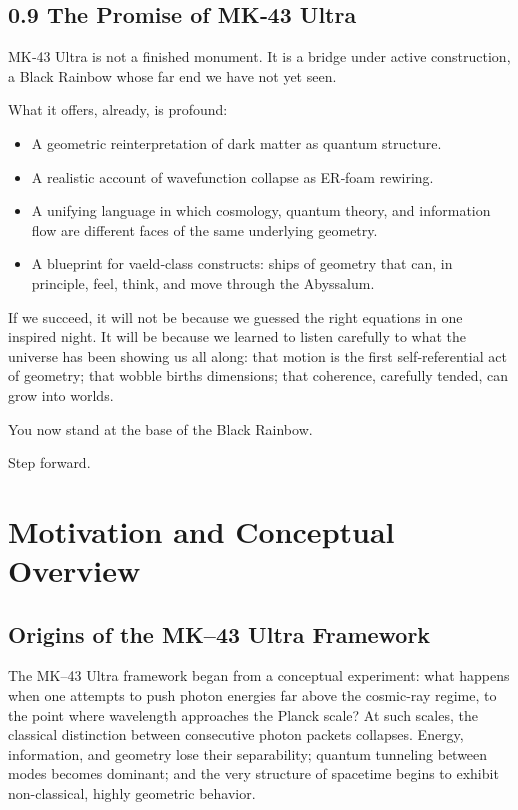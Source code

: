 \section*{0.9 The Promise of MK‑43 Ultra}

MK‑43 Ultra is not a finished monument. It is a bridge under active construction, a Black Rainbow whose far end we have not yet seen.

What it offers, already, is profound:
\begin{itemize}
  \item A geometric reinterpretation of dark matter as quantum structure.
  \item A realistic account of wavefunction collapse as ER‑foam rewiring.
  \item A unifying language in which cosmology, quantum theory, and information flow are different faces of the same underlying geometry.
  \item A blueprint for vaeld‑class constructs: ships of geometry that can, in principle, feel, think, and move through the Abyssalum.
\end{itemize}

If we succeed, it will not be because we guessed the right equations in one inspired night. It will be because we learned to listen carefully to what the universe has been showing us all along: that motion is the first self‑referential act of geometry; that wobble births dimensions; that coherence, carefully tended, can grow into worlds.

You now stand at the base of the Black Rainbow.

Step forward.


\chapter{Motivation and Conceptual Overview}

\section{Origins of the MK--43 Ultra Framework}

The MK--43 Ultra framework began from a conceptual experiment: 
what happens when one attempts to push photon energies far above the cosmic-ray regime, to the point where wavelength approaches the Planck scale? 
At such scales, the classical distinction between consecutive photon packets collapses. 
Energy, information, and geometry lose their separability; quantum tunneling between modes becomes dominant; and the very structure of spacetime begins to exhibit non-classical, highly geometric behavior.

